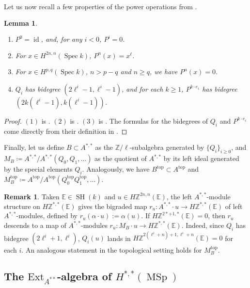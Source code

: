 \documentclass[10pt]{amsart}
\theoremstyle{definition}
\newtheorem{rmk}[defn]{Remark}
\theoremstyle{plain}
\newtheorem{lemma}[defn]{Lemma}
\numberwithin{equation}{section}
\newcommand{\0}{\emptyset}
\newcommand{\E}{{\mathbb E}}
\newcommand{\Z}{{\mathbb Z}}
\newcommand{\MSp}{{\operatorname{MSp}}}
\newcommand{\Spec}{{\operatorname{Spec}}}
\newcommand{\SH}{{\operatorname{SH}}}
\renewcommand{\top}{{\operatorname{top}}}
\newcommand{\id}{{\operatorname{id}}}
\begin{document}
Let us now recall a few properties of the power operations from \cite{Voev-power}.

\begin{lemma}
\label{lemma:someproperties}
\begin{enumerate}
    \item[(1)] $P^0= \id$, and, for any $i<0$, $P^i=0$.
    \item[(2)] For $x \in H^{2n,n}(\Spec k)$, $P^n(x)=x^\ell$.
    \item[(3)] For $x \in H^{p,q}(\Spec k)$, $n > p-q$ and $n\ge q$, we have $P^n(x)=0$.
    \item[(4)] $Q_i$ has bidegree $(2 \ell^i -1, \ell^i-1)$, and for each $k \ge 1$, $P^{k \cdot e_i}$ has bidegree $(2k(\ell^i-1),k(\ell^i-1))$.
\end{enumerate}
\end{lemma}

\begin{proof}
    $(1)$ is \cite[Theorems 9.4-9.5]{Voev-power}. $(2)$ is \cite[Lemma 9.8]{Voev-power}. $(3)$ is \cite[9.9]{Voev-power}. The formulas for the bidegrees of $Q_i$ and $P^{k \cdot e_i}$ come directly from their definition in \cite[Section 13]{Voev-power}.
\end{proof}

Finally, let us define $B \subset A^{*,*}$ as the $\Z/\ell$-subalgebra generated by $\{Q_i\}_{i\ge 0}$, and $M_B \coloneqq A^{*,*}/A^{*,*}(Q_0,Q_1, \ldots)$ as the quotient of $A^{*,*}$ by its left ideal generated by the special elements $Q_i$. Analogously, we have $B^{\top} \subset A^{\top}$ and $M_B^{\top} \coloneqq A^{\top}/A^{\top}(Q_0^{\top}Q_1^{\top}, \ldots)$. 

\begin{rmk}\label{rmk:MBDescent} Taken $\E \in \SH(k)$  and  $u\in H\Z^{2n,n}(\E)$, the left $A^{*,*}$-module structure on $H\Z^{*,*}(\E)$ gives the bigraded map  $r_u:A^{*, *}\cdot u\to H\Z^{*,*}(\E)$ of left $A^{*,*}$-modules, defined by $r_u(\alpha\cdot u):= \alpha(u)$. If $H\Z^{2*+1,*}(\E)=0$, then $r_u$ descends to a map of $A^{*,*}$-modules $r_u:M_B\cdot u\to H\Z^{*,*}(\E)$. Indeed, since $Q_i$ has bidegree $(2\ell^i+1, \ell^i)$, $Q_i(u)$ lands in $H\Z^{2(\ell^i+n)+1, \ell^i+n}(\E)=0$ for each $i$. An analogous statement in the topological setting holds for $M_B^{\top}$.
\end{rmk}

\subsection{The $\text{Ext}_{A^{**}}$-algebra of $H^{*,*}(\MSp)$}
\end{document}
